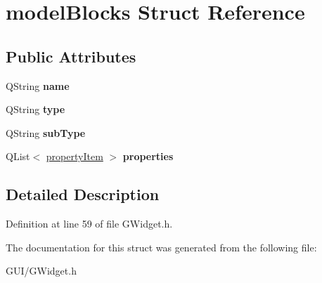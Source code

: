 \hypertarget{structmodel_blocks}{}\section{model\+Blocks Struct Reference}
\label{structmodel_blocks}
\subsection*{Public Attributes}
\begin{DoxyCompactItemize}
\item 
\mbox{\label{structmodel_blocks_a396fb9c381f4899ccb66765510994d9e}} 
Q\+String {\bfseries name}
\item 
\mbox{\label{structmodel_blocks_af8a00bcd669f202723e2b601ec16ec77}} 
Q\+String {\bfseries type}
\item 
\mbox{\label{structmodel_blocks_a1fd4966aedf848aeac8e730e2095f250}} 
Q\+String {\bfseries sub\+Type}
\item 
\mbox{\label{structmodel_blocks_ab7fe77e323f7a7fae70b2aa88d5b264c}} 
Q\+List$<$ \hyperlink{structproperty_item}{property\+Item} $>$ {\bfseries properties}
\end{DoxyCompactItemize}


\subsection{Detailed Description}


Definition at line 59 of file G\+Widget.\+h.



The documentation for this struct was generated from the following file\+:\begin{DoxyCompactItemize}
\item 
G\+U\+I/G\+Widget.\+h\end{DoxyCompactItemize}
